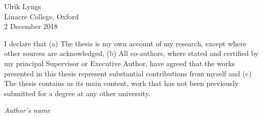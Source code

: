 \documentclass[a4paper, nobind]{templates/ociamthesis}
\begin{document}
\begin{romanpages}
\begin{acknowledgements}
  \begin{flushright}
  Ulrik Lyngs \\
  Linacre College, Oxford \\
  2 December 2018
  \end{flushright}
\end{acknowledgements}


\begin{abstract}
	This \emph{R Markdown} template is for writing an Oxford University thesis. The template is built using Yihui Xie's \texttt{bookdown} package, with heavy inspiration from Chester Ismay's \texttt{thesisdown} and the \texttt{OxThesis} \LaTeX~template (most recently adapted by John McManigle).

 This template's sample content include illustrations of how to write a thesis in R Markdown, and largely follows the structure from \href{https://ulyngs.github.io/rmarkdown-workshop-2019/}{this R Markdown workshop}.

 Congratulations for taking a step further into the lands of open, reproducible science by writing your thesis using a tool that allows you to transparently include tables and dynamically generated plots directly from the underlying data. Hip hooray!
\end{abstract}

\begin{declaration}
	I declare that (a) The thesis is my own account of my research, except where other sources are acknowledged, (b) All co-authors, where stated and certified by my principal Supervisor or Executive Author, have agreed that the works presented in this thesis represent substantial contributions from myself and (c) The thesis contains as its main content, work that has not been previously submitted for a degree at any other university.

 \emph{Author's name}
\end{declaration}

  \dominitoc %

\flushbottom


\end{romanpages}
\end{document}
